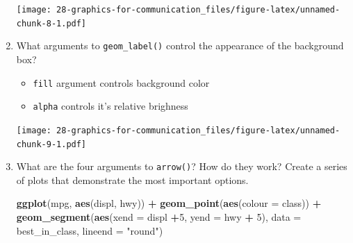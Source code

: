 \documentclass[]{book}
\newenvironment{Shaded}{\begin{snugshade}}{\end{snugshade}}
\newcommand{\DataTypeTok}[1]{\textcolor[rgb]{0.13,0.29,0.53}{#1}}
\newcommand{\DecValTok}[1]{\textcolor[rgb]{0.00,0.00,0.81}{#1}}
\newcommand{\FloatTok}[1]{\textcolor[rgb]{0.00,0.00,0.81}{#1}}
\newcommand{\KeywordTok}[1]{\textcolor[rgb]{0.13,0.29,0.53}{\textbf{#1}}}
\newcommand{\NormalTok}[1]{#1}
\newcommand{\OperatorTok}[1]{\textcolor[rgb]{0.81,0.36,0.00}{\textbf{#1}}}
\newcommand{\StringTok}[1]{\textcolor[rgb]{0.31,0.60,0.02}{#1}}
\providecommand{\tightlist}{%
  \setlength{\itemsep}{0pt}\setlength{\parskip}{0pt}}
\theoremstyle{definition}
\theoremstyle{definition}
\theoremstyle{definition}
\theoremstyle{remark}
\begin{document}
\begin{enumerate}
  \texttt{[image: 28-graphics-for-communication\_files/figure-latex/unnamed-chunk-8-1.pdf]}
\item
  What arguments to \texttt{geom\_label()} control the appearance of the
  background box?

  \begin{itemize}
  \tightlist
  \item
    \texttt{fill} argument controls background color
  \item
    \texttt{alpha} controls it's relative brighness
  \end{itemize}

\begin{Shaded}
\end{Shaded}

  \texttt{[image: 28-graphics-for-communication\_files/figure-latex/unnamed-chunk-9-1.pdf]}
\item
  What are the four arguments to \texttt{arrow()}? How do they work?
  Create a series of plots that demonstrate the most important options.

\begin{Shaded}
\begin{Highlighting}[]
\KeywordTok{ggplot}\NormalTok{(mpg, }\KeywordTok{aes}\NormalTok{(displ, hwy)) }\OperatorTok{+}
\StringTok{  }\KeywordTok{geom_point}\NormalTok{(}\KeywordTok{aes}\NormalTok{(}\DataTypeTok{colour =}\NormalTok{ class)) }\OperatorTok{+}
\StringTok{  }\KeywordTok{geom_segment}\NormalTok{(}\KeywordTok{aes}\NormalTok{(}\DataTypeTok{xend =}\NormalTok{ displ }\OperatorTok{+}\DecValTok{5}\NormalTok{, }\DataTypeTok{yend =}\NormalTok{ hwy }\OperatorTok{+}\StringTok{ }\DecValTok{5}\NormalTok{), }\DataTypeTok{data =}\NormalTok{ best_in_class, }\DataTypeTok{lineend =} \StringTok{"round"}\NormalTok{)}
\end{Highlighting}
\end{Shaded}


\end{enumerate}
\end{document}
